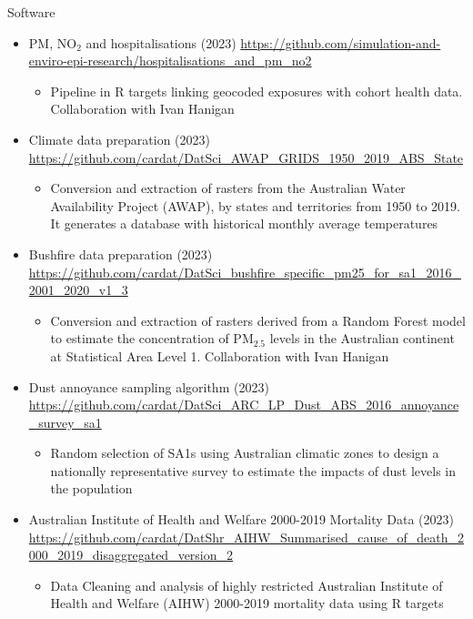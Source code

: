 \begin{rSection}{Software}
\begin{itemize}
\item{PM, NO$_{2}$ and hospitalisations (2023)} \url{https://github.com/simulation-and-enviro-epi-research/hospitalisations_and_pm_no2}
	\begin{itemize}
		\item{Pipeline in R targets linking geocoded exposures with cohort health data. Collaboration with Ivan Hanigan}
	\end{itemize}
	
\item{Climate data preparation (2023)} \url{https://github.com/cardat/DatSci_AWAP_GRIDS_1950_2019_ABS_State}
	\begin{itemize}
		\item{Conversion and extraction of rasters from the Australian Water Availability Project (AWAP), by states and territories from 1950 to 2019. It generates a database with historical monthly average temperatures}
	\end{itemize}
	
 \item{Bushfire data preparation (2023)} \url{https://github.com/cardat/DatSci_bushfire_specific_pm25_for_sa1_2016_2001_2020_v1_3}
 \begin{itemize}
 	\item{Conversion and extraction of rasters derived from a Random Forest model to estimate the concentration of PM$_{2.5}$ levels in the Australian continent at Statistical Area Level 1. Collaboration with Ivan Hanigan}
 \end{itemize}
 
\item{Dust annoyance sampling algorithm (2023)} \url{https://github.com/cardat/DatSci_ARC_LP_Dust_ABS_2016_annoyance_survey_sa1}
 \begin{itemize}
 	\item{Random selection of SA1s using Australian climatic zones to design a nationally representative survey to estimate the impacts of dust levels in the population}
 \end{itemize}
 
\item{Australian Institute of Health and Welfare 2000-2019 Mortality Data (2023)} \url{https://github.com/cardat/DatShr_AIHW_Summarised_cause_of_death_2000_2019_disaggregated_version_2}
 \begin{itemize}
 	\item{Data Cleaning and analysis of highly restricted Australian Institute of Health and Welfare (AIHW) 2000-2019 mortality data using R targets}
 \end{itemize}
 

\end{itemize}
\end{rSection}
